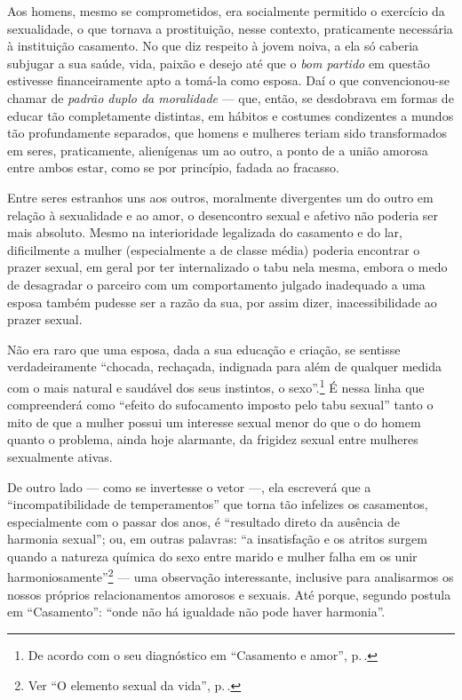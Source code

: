 Aos homens, mesmo se comprometidos, era socialmente
permitido o exercício da sexualidade, o que tornava a prostituição,
nesse contexto, praticamente necessária à instituição
casamento. No que diz respeito à jovem noiva, a ela só caberia subjugar
a sua saúde, vida, paixão e desejo até que o \textit{bom partido} em questão
estivesse financeiramente apto a tomá-la como esposa. Daí o que
convencionou-se chamar de \textit{padrão duplo da moralidade} --- que, então,
se desdobrava em formas de educar tão completamente distintas, em
hábitos e costumes condizentes a mundos tão profundamente separados, que
homens e mulheres teriam sido transformados em seres, praticamente,
alienígenas um ao outro, a ponto de a união amorosa entre ambos estar,
como se por princípio, fadada ao fracasso.

Entre seres estranhos uns aos outros, moralmente divergentes um do
outro em relação à sexualidade e ao amor, o desencontro sexual
e afetivo não poderia ser mais absoluto. Mesmo na interioridade
legalizada do casamento e do lar, dificilmente a mulher (especialmente
a de classe média) poderia encontrar o prazer sexual, em
geral por ter internalizado o tabu nela mesma, embora
o medo de desagradar o parceiro com um comportamento julgado
inadequado a uma esposa também pudesse ser a razão da sua, por assim dizer,
inacessibilidade ao prazer sexual.

Não era raro que uma esposa, dada a sua educação e
criação, se sentisse verdadeiramente ``chocada, rechaçada, indignada
para além de qualquer medida com o mais natural e saudável dos seus
instintos, o sexo''.\footnote{De acordo com o seu diagnóstico em
``Casamento e amor'', p.\,\pageref{artesao}.}
É nessa linha que compreenderá como ``efeito do
sufocamento imposto pelo tabu sexual'' tanto o mito de que a mulher
possui um interesse sexual menor do que o do homem quanto o problema,
ainda hoje alarmante, da frigidez sexual entre mulheres sexualmente
ativas.

De outro lado --- como se invertesse o vetor ---,
ela escreverá que a
``incompatibilidade de temperamentos'' que torna tão infelizes os
casamentos, especialmente com o passar dos anos, é ``resultado direto da
ausência de harmonia sexual''; ou, em outras palavras: ``a insatisfação
e os atritos surgem quando a natureza química do sexo entre marido e
mulher falha em os unir harmoniosamente''\footnote{Ver ``O elemento sexual da vida'', p.\,\pageref{unir}.} --- uma observação
interessante, inclusive para analisarmos os nossos próprios
relacionamentos amorosos e sexuais. Até porque, segundo postula em
``Casamento'': ``onde não há igualdade não pode haver harmonia''.

